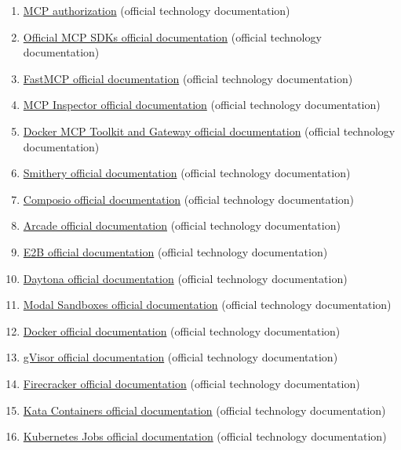 \begin{enumerate}
\item \href{https://modelcontextprotocol.io/specification/latest/basic/authorization}{MCP authorization} (official technology documentation)
\item \href{https://modelcontextprotocol.io/docs/sdk}{Official MCP SDKs official documentation} (official technology documentation)
\item \href{https://gofastmcp.com/getting-started/welcome}{FastMCP official documentation} (official technology documentation)
\item \href{https://github.com/modelcontextprotocol/inspector}{MCP Inspector official documentation} (official technology documentation)
\item \href{https://docs.docker.com/ai/mcp-catalog-and-toolkit/}{Docker MCP Toolkit and Gateway official documentation} (official technology documentation)
\item \href{https://smithery.ai/docs}{Smithery official documentation} (official technology documentation)
\item \href{https://docs.composio.dev/}{Composio official documentation} (official technology documentation)
\item \href{https://docs.arcade.dev/}{Arcade official documentation} (official technology documentation)
\item \href{https://e2b.dev/docs}{E2B official documentation} (official technology documentation)
\item \href{https://www.daytona.io/docs/}{Daytona official documentation} (official technology documentation)
\item \href{https://modal.com/docs/guide/sandbox}{Modal Sandboxes official documentation} (official technology documentation)
\item \href{https://docs.docker.com/engine/security/}{Docker official documentation} (official technology documentation)
\item \href{https://gvisor.dev/docs/}{gVisor official documentation} (official technology documentation)
\item \href{https://github.com/firecracker-microvm/firecracker}{Firecracker official documentation} (official technology documentation)
\item \href{https://katacontainers.io/docs/}{Kata Containers official documentation} (official technology documentation)
\item \href{https://kubernetes.io/docs/concepts/workloads/controllers/job/}{Kubernetes Jobs official documentation} (official technology documentation)

\end{enumerate}
